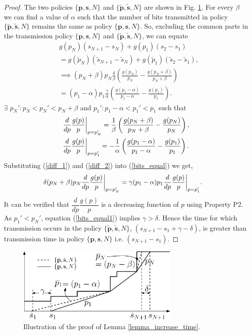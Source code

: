 \begin{proof}
The two policies $\{\textbf{p},\textbf{s},N\}$  and $\{\bm{\widetilde{p}},\bm{\widetilde{s}},N\}$ are shown in Fig. \ref{lemma4}. For every $\beta$ we can find a value of $\alpha$ such that the number of bits transmitted in policy $\{\bm{\widetilde{p}},\bm{\widetilde{s}},N\}$ remains the same as policy $\{\textbf{p},\textbf{s},N\}$. So, excluding the common parts in the transmission policy $\{\textbf{p},\textbf{s},N\}$ and $\{\bm{\widetilde{p}},\bm{\widetilde{s}},N\}$, we can equate
\begin{align}
&g(p_N)(s_{N+1}-s_N)+g(p_1)(s_2-s_1)\nonumber
\\
&=g(\widetilde{p}_N)(\widetilde{s}_{N+1}-\widetilde{s}_N)+g(\widetilde{p}_1)(\widetilde{s}_2-\widetilde{s}_1)\nonumber,
\\
&\implies (p_N+\beta)p_N\frac{\delta}{\beta}\left(\frac{g(p_N)}{p_N}-\frac{g(p_N+\beta)}{p_N+\beta}\right)\nonumber
\\
&=(p_1-\alpha)p_1\frac{\gamma}{\alpha}\left(\frac{g(p_1-\alpha)}{p_1-\alpha}-\frac{g(p_1)}{p_1}\right).\label{bits_equal}
\end{align}
$\exists$ $p_N':p_N<p_N'<p_{N}+\beta$ and $p_1':p_1-\alpha<p_1'<p_{1}$ such that
\begin{align}
&\frac{d}{dp} \frac{g(p)}{p} \bigg{\vert}_{p=p_N'}=\frac{1}{\beta}\left(\frac{g(p_N+\beta)}{p_N+\beta}-\frac{g(p_N)}{p_N}\right),\label{diff_1}
\\
&\frac{d}{dp} \frac{g(p)}{p}\bigg{\vert}_{p=p_1'}=-\frac{1}{\alpha}\left(\frac{g(p_1-\alpha)}{p_1-\alpha}-\frac{g(p_1)}{p_1}\right)\label{diff_2}.
\end{align}
Substituting (\ref{diff_1}) and (\ref{diff_2}) into (\ref{bits_equal}) we get,
\begin{align}
&\delta(p_N+\beta)p_N\frac{d}{dp} \frac{g(p)}{p}  \bigg{\vert}_{p=p_N'}
=\gamma(p_1-\alpha)p_1\frac{d}{dp} \frac{g(p)}{p} \bigg{\vert}_{p=p_1'}.\label{bits_equal1}
\end{align}
It can be verified that $\dfrac{d}{dp} \dfrac{g(p)}{p}$ is a decreasing function of $p$ using Property P2. As $p_1'<p_N'$, equation (\ref{bits_equal1}) implies $\gamma >\delta$. Hence the time for which transmission occurs in the policy $\{\bm{\widetilde{p}},\bm{\widetilde{s}},N\}$, $\left( s_{N+1}-s_1+\gamma-\delta\right)$, is greater than transmission time in policy $\{\textbf{p},\textbf{s},N\}$ i.e. $(s_{N+1}-s_1)$.
\end{proof}
\begin{figure}
\centering
  \centerline{\includegraphics[width=8cm]{Lemma4.eps}}
\caption{Illustration of the proof of Lemma \ref{lemma_increase_time}.}\label{lemma4}
\end{figure}

